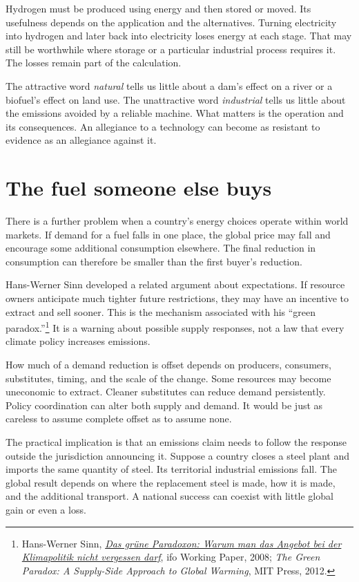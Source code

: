 \documentclass[12pt,a4paper]{book}
\begin{document}
Hydrogen must be produced using energy and then stored or moved. Its usefulness depends on the application and the alternatives. Turning electricity into hydrogen and later back into electricity loses energy at each stage. That may still be worthwhile where storage or a particular industrial process requires it. The losses remain part of the calculation.

The attractive word \emph{natural} tells us little about a dam's effect on a river or a biofuel's effect on land use. The unattractive word \emph{industrial} tells us little about the emissions avoided by a reliable machine. What matters is the operation and its consequences. An allegiance to a technology can become as resistant to evidence as an allegiance against it.

\section*{The fuel someone else buys}

There is a further problem when a country's energy choices operate within world markets. If demand for a fuel falls in one place, the global price may fall and encourage some additional consumption elsewhere. The final reduction in consumption can therefore be smaller than the first buyer's reduction.

Hans-Werner Sinn developed a related argument about expectations. If resource owners anticipate much tighter future restrictions, they may have an incentive to extract and sell sooner. This is the mechanism associated with his ``green paradox.''\footnote{Hans-Werner Sinn, \href{https://www.ifo.de/en/publications/2008/working-paper/das-grune-paradoxon-warum-man-das-angebot-bei-der-klimapolitik}{\emph{Das grüne Paradoxon: Warum man das Angebot bei der Klimapolitik nicht vergessen darf}}, ifo Working Paper, 2008; \emph{The Green Paradox: A Supply-Side Approach to Global Warming}, MIT Press, 2012.} It is a warning about possible supply responses, not a law that every climate policy increases emissions.

How much of a demand reduction is offset depends on producers, consumers, substitutes, timing, and the scale of the change. Some resources may become uneconomic to extract. Cleaner substitutes can reduce demand persistently. Policy coordination can alter both supply and demand. It would be just as careless to assume complete offset as to assume none.

The practical implication is that an emissions claim needs to follow the response outside the jurisdiction announcing it. Suppose a country closes a steel plant and imports the same quantity of steel. Its territorial industrial emissions fall. The global result depends on where the replacement steel is made, how it is made, and the additional transport. A national success can coexist with little global gain or even a loss.
\end{document}
